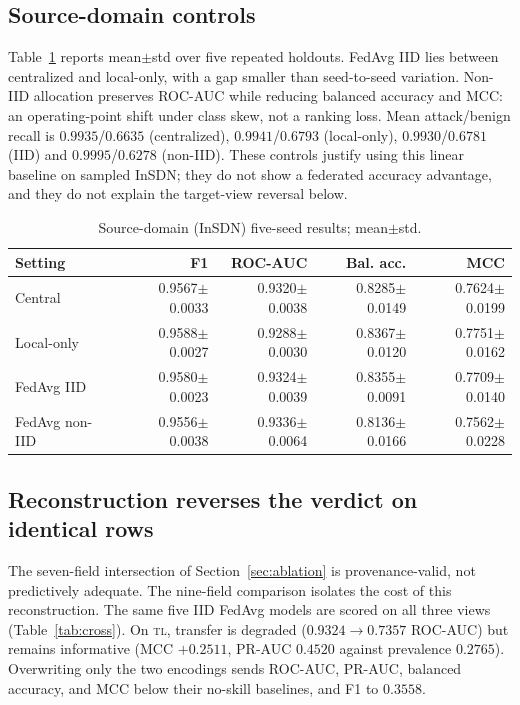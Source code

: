 \documentclass[conference,a4paper]{IEEEtran}
\begin{document}
\subsection{Source-domain controls}
Table~\ref{tab:results} reports mean$\pm$std over five repeated holdouts. FedAvg IID lies between centralized and local-only, with a gap smaller than seed-to-seed variation. Non-IID allocation preserves ROC-AUC while reducing balanced accuracy and MCC: an operating-point shift under class skew, not a ranking loss. Mean attack/benign recall is $0.9935$/$0.6635$ (centralized), $0.9941$/$0.6793$ (local-only), $0.9930$/$0.6781$ (IID) and $0.9995$/$0.6278$ (non-IID). These controls justify using this linear baseline on sampled InSDN; they do not show a federated accuracy advantage, and they do not explain the target-view reversal below.
\begin{table}[t]
\caption{Source-domain (InSDN) five-seed results; mean$\pm$std.}\label{tab:results}\centering\scriptsize\setlength{\tabcolsep}{2.5pt}
\begin{tabular}{lrrrr}\toprule
Setting&F1&ROC-AUC&Bal. acc.&MCC\\\midrule
Central&0.9567$\pm$0.0033&0.9320$\pm$0.0038&0.8285$\pm$0.0149&0.7624$\pm$0.0199\\
Local-only&0.9588$\pm$0.0027&0.9288$\pm$0.0030&0.8367$\pm$0.0120&0.7751$\pm$0.0162\\
FedAvg IID&0.9580$\pm$0.0023&0.9324$\pm$0.0039&0.8355$\pm$0.0091&0.7709$\pm$0.0140\\
FedAvg non-IID&0.9556$\pm$0.0038&0.9336$\pm$0.0064&0.8136$\pm$0.0166&0.7562$\pm$0.0228\\\bottomrule
\end{tabular}\end{table}

\subsection{Reconstruction reverses the verdict on identical rows}\label{sec:cf}
The seven-field intersection of Section~\ref{sec:ablation} is provenance-valid, not predictively adequate. The nine-field comparison isolates the cost of this reconstruction. The same five IID FedAvg models are scored on all three views (Table~\ref{tab:cross}). On \textsc{tl}, transfer is degraded ($0.9324\rightarrow0.7357$ ROC-AUC) but remains informative (MCC $+0.2511$, PR-AUC $0.4520$ against prevalence $0.2765$). Overwriting only the two encodings sends ROC-AUC, PR-AUC, balanced accuracy, and MCC below their no-skill baselines, and F1 to $0.3558$.
\end{document}
